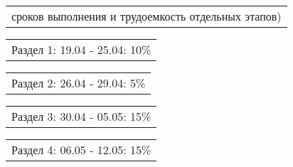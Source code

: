 \documentclass[12pt, А4, twoside]{article}
\begin{document}
\begin{FlushLeft}
    \vspace{-0.1 cm}

    \begin{tabular}{p{17.25cm}} 
        \textsf{сроков выполнения и трудоемкость отдельных этапов)} \vspace{0pt} \hline \\
    \end{tabular} 

    \vspace{-0.1 cm}

    \begin{tabular}{p{17.25cm}} 
        \hspace{0.3cm} \textsf{Раздел 1:} \hspace{2.54cm} \textsf{ 19.04 - 25.04:} \hspace{0.5cm} \textsf{10\%} \vspace{0pt} \hline \\
    \end{tabular} 

    \vspace{-0.1 cm}

    \begin{tabular}{p{17.25cm}} 
        \hspace{0.3cm} \textsf{Раздел 2:} \hspace{2.54cm} \textsf{ 26.04 - 29.04:} \hspace{0.5cm} \textsf{5\%} \vspace{0pt} \hline \\
    \end{tabular} 

    \vspace{-0.1 cm}

    \begin{tabular}{p{17.25cm}} 
        \hspace{0.3cm} \textsf{Раздел 3:} \hspace{2.54cm} \textsf{ 30.04 - 05.05:} \hspace{0.5cm} \textsf{15\%} \vspace{0pt} \hline \\
    \end{tabular}

    \vspace{-0.1 cm}

    \begin{tabular}{p{17.25cm}}  
        \hspace{0.3cm} \textsf{Раздел 4:} \hspace{2.54cm} \textsf{ 06.05 - 12.05:} \hspace{0.5cm} \textsf{15\%} \vspace{0pt} \hline \\
    \end{tabular} 


\end{FlushLeft}
\end{document}
